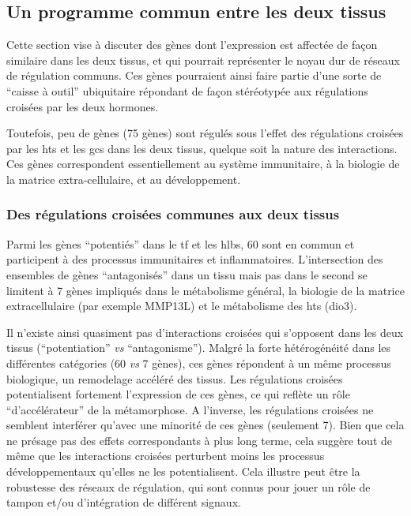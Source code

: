\documentclass[../main.tex]{subfiles}
\begin{document}
	\subsection{Un programme commun entre les deux tissus}
		Cette section vise à discuter des gènes dont l'expression est affectée de façon similaire dans les deux tissus, et qui pourrait représenter le noyau dur de réseaux de régulation communs.
		Ces gènes pourraient ainsi faire partie d'une sorte de ``caisse à outil'' ubiquitaire répondant de façon stéréotypée aux régulations croisées par les deux hormones.
		\par
		Toutefois, peu de gènes (75 gènes) sont régulés sous l'effet des régulations croisées par les \glspl{ht} et les \glspl{gc} dans les deux tissus, quelque soit la nature des interactions.
		Ces gènes correspondent essentiellement au système immunitaire, à la biologie de la matrice extra-cellulaire, et au développement.

		\subsubsection{Des régulations croisées communes aux deux tissus}
			Parmi les gènes ``potentiés'' dans le \gls{tf} et les \glspl{hlb}, 60 sont en commun et participent à des processus immunitaires et inflammatoires.
			L'intersection des ensembles de gènes ``antagonisés'' dans un tissu mais pas dans le second se limitent à 7 gènes impliqués dans le métabolisme général, la biologie de la matrice extracellulaire (par exemple MMP13L) et le métabolisme des \glspl{ht} (\gls{dio3}).
			\par
			Il n'existe ainsi quasiment pas d'interactions croisées qui s'opposent dans les deux tissus (``potentiation'' \textit{vs} ``antagonisme'').
			Malgré la forte hétérogénéité dans les différentes catégories (60 \textit{vs} 7 gènes), ces gènes répondent à un même processus biologique, un remodelage accéléré des tissus.
			Les régulations croisées potentialisent fortement l'expression de ces gènes, ce qui reflète un rôle ``d'accélérateur'' de la métamorphose.
			A l'inverse, les régulations croisées ne semblent interférer qu'avec une minorité de ces gènes (seulement 7).
			Bien que cela ne présage pas des effets correspondants à plus long terme, cela suggère tout de même que les interactions croisées perturbent moins les processus développementaux qu'elles ne les potentialisent.
			Cela illustre peut être la robustesse des réseaux de régulation, qui sont connus pour jouer un rôle de tampon et/ou d'intégration de différent signaux.
\end{document}
